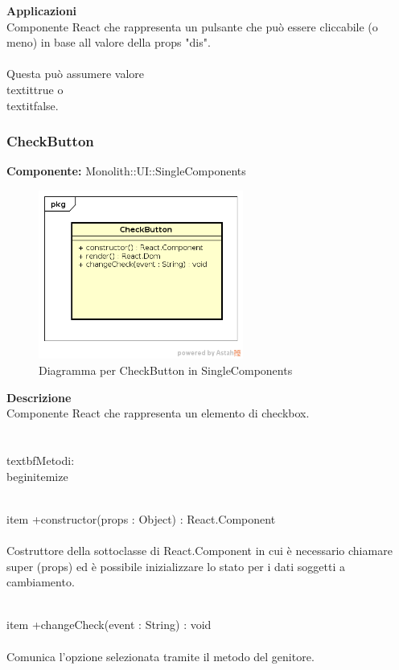 \textbf{Applicazioni}\\
Componente React che rappresenta un pulsante che può essere cliccabile (o meno) in base all valore della props "dis". \\\\ Questa può assumere valore \\textit{true} o \\textit{false}. 


\clearpage

\subsubsection{CheckButton}
\textbf{Componente:}  Monolith::UI::SingleComponents\\
   \FloatBarrier
   \begin{figure}[ht]
   \centering
   \includegraphics[width=0.6\textwidth]{img/single-CheckButton}
   \caption{{Diagramma per CheckButton in SingleComponents}}
\end{figure}
\FloatBarrier
\textbf{Descrizione}\\
Componente React che rappresenta un elemento di checkbox. \\\\
\\textbf{Metodi:} 
\\begin{itemize}

\\item +constructor(props : Object) : React.Component 
\\\\
Costruttore della sottoclasse di React.Component in cui è necessario chiamare super (props) ed è possibile inizializzare lo stato per i dati soggetti a cambiamento.

\\item +changeCheck(event : String) : void  
\\\\
Comunica l’opzione selezionata tramite il metodo del genitore. 

